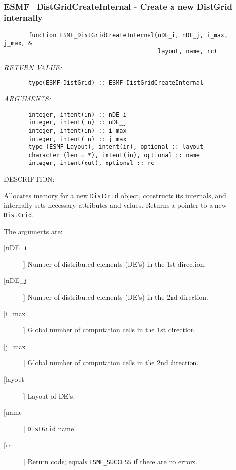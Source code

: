  
\mbox{}\hrulefill\ 
 
\subsubsection{ESMF\_DistGridCreateInternal - Create a new DistGrid internally}


\begin{verbatim}       function ESMF_DistGridCreateInternal(nDE_i, nDE_j, i_max, j_max, &
                                            layout, name, rc)\end{verbatim}{\em RETURN VALUE:}
\begin{verbatim}       type(ESMF_DistGrid) :: ESMF_DistGridCreateInternal\end{verbatim}{\em ARGUMENTS:}
\begin{verbatim}       integer, intent(in) :: nDE_i
       integer, intent(in) :: nDE_j
       integer, intent(in) :: i_max
       integer, intent(in) :: j_max
       type (ESMF_Layout), intent(in), optional :: layout
       character (len = *), intent(in), optional :: name  
       integer, intent(out), optional :: rc               
 \end{verbatim}
{\sf DESCRIPTION:\\ }


       Allocates memory for a new {\tt DistGrid} object, constructs its
       internals, and internally sets necessary attributes and values.
       Returns a pointer to a new {\tt DistGrid}.
  
       The arguments are:
       \begin{description}
       \item[[nDE\_i]] 
            Number of distributed elements (DE's) in the 1st direction.
       \item[[nDE\_j]] 
            Number of distributed elements (DE's) in the 2nd direction.
       \item[[i\_max]] 
            Global number of computation cells in the 1st direction.
       \item[[j\_max]] 
            Global number of computation cells in the 2nd direction.
       \item[[layout]]
            Layout of DE's.
       \item[[name]] 
            {\tt DistGrid} name.
       \item[[rc]] 
            Return code; equals {\tt ESMF\_SUCCESS} if there are no errors.
     \end{description}
  
